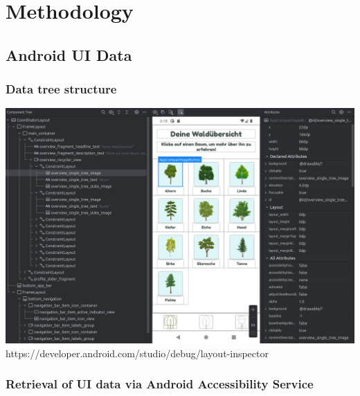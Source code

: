 \chapter{Methodology}





\section{Android UI Data}
\subsection{Data tree structure}


\includegraphics[width=\textwidth]{graphics/android_layout_inspector}
https://developer.android.com/studio/debug/layout-inspector

\subsection{Retrieval of UI data via Android Accessibility Service}

